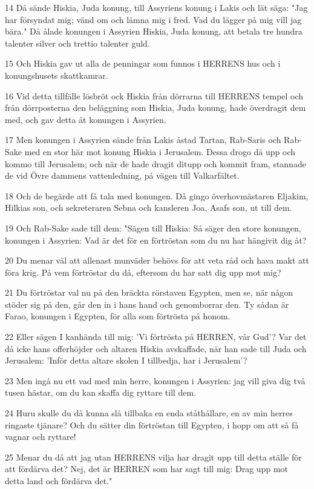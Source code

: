\par 14 Då sände Hiskia, Juda konung, till Assyriens konung i Lakis och lät säga: "Jag har försyndat mig; vänd om och lämna mig i fred. Vad du lägger på mig vill jag bära." Då ålade konungen i Assyrien Hiskia, Juda konung, att betala tre hundra talenter silver och trettio talenter guld.
\par 15 Och Hiskia gav ut alla de penningar som funnos i HERRENS hus och i konungshusets skattkamrar.
\par 16 Vid detta tillfälle lösbröt ock Hiskia från dörrarna till HERRENS tempel och från dörrposterna den beläggning som Hiskia, Juda konung, hade överdragit dem med, och gav detta åt konungen i Assyrien.
\par 17 Men konungen i Assyrien sände från Lakis åstad Tartan, Rab-Saris och Rab-Sake med en stor här mot konung Hiskia i Jerusalem. Dessa drogo då upp och kommo till Jerusalem; och när de hade dragit ditupp och kommit fram, stannade de vid Övre dammens vattenledning, på vägen till Valkarfältet.
\par 18 Och de begärde att få tala med konungen. Då gingo överhovmästaren Eljakim, Hilkias son, och sekreteraren Sebna och kansleren Joa, Asafs son, ut till dem.
\par 19 Och Rab-Sake sade till dem: "Sägen till Hiskia: Så säger den store konungen, konungen i Assyrien: Vad är det för en förtröstan som du nu har hängivit dig åt?
\par 20 Du menar väl att allenast munväder behövs för att veta råd och hava makt att föra krig. På vem förtröstar du då, eftersom du har satt dig upp mot mig?
\par 21 Du förtröstar val nu på den bräckta rörstaven Egypten, men se, när någon stöder sig på den, går den in i hans hand och genomborrar den. Ty sådan är Farao, konungen i Egypten, för alla som förtrösta på honom.
\par 22 Eller sägen I kanhända till mig: 'Vi förtrösta på HERREN, vår Gud'? Var det då icke hans offerhöjder och altaren Hiskia avskaffade, när han sade till Juda och Jerusalem: 'Inför detta altare skolen I tillbedja, har i Jerusalem'?
\par 23 Men ingå nu ett vad med min herre, konungen i Assyrien: jag vill giva dig två tusen hästar, om du kan skaffa dig ryttare till dem.
\par 24 Huru skulle du då kunna slå tillbaka en enda ståthållare, en av min herres ringaste tjänare? Och du sätter din förtröstan till Egypten, i hopp om att så få vagnar och ryttare!
\par 25 Menar du då att jag utan HERRENS vilja har dragit upp till detta ställe för att fördärva det? Nej, det är HERREN som har sagt till mig: Drag upp mot detta land och fördärva det."
